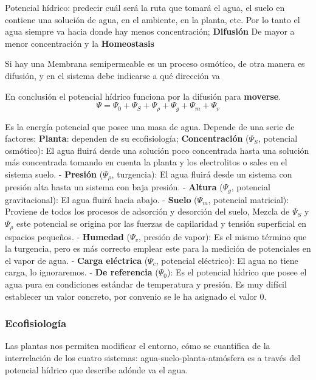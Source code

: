 Potencial hídrico: predecir cuál será la ruta que tomará el agua, el suelo en contiene una solución de agua, en el ambiente, en la planta, etc. Por lo tanto el agua siempre va hacia donde hay menos concentración; \textbf{Difusión} De mayor a menor concentración y la \textbf{Homeostasis}

Si hay una Membrana semipermeable es un proceso osmótico, de otra manera es difusión, y en el sistema debe indicarse a qué dirección va

En conclusión el potencial hídrico funciona por la difusión para \textbf{moverse}.
\begin{equation}
    \Psi= \Psi_0 + \Psi_S + \Psi_{\rho} + \Psi_g + \Psi_m + \Psi_v
\end{equation}
\begin{definition}
    Es la energía potencial que posee una masa de agua. Depende de una serie de factores: \textbf{Planta}: dependen de su ecofisiología; \textbf{Concentración} ($\Psi_S$, potencial osmótico): El agua fluirá desde una solución poco concentrada hasta una solución más concentrada tomando en cuenta la planta y los electrolitos o sales en el sistema suelo. - \textbf{Presión} ($\Psi_{\rho}$, turgencia): El agua fluirá desde un sistema con presión alta hasta un sistema con baja presión. - \textbf{Altura} ($\Psi_g$, potencial gravitacional): El agua fluirá hacia abajo. - \textbf{Suelo} ($\Psi_m$, potencial matricial): Proviene de todos los procesos de adsorción y desorción del suelo,  Mezcla de $\Psi_S$ y $\Psi_{\rho}$ este potencial se origina por las fuerzas de capilaridad y tensión superficial en espacios pequeños. - \textbf{Humedad} ($\Psi_v$, presión de vapor): Es el mismo término que la turgencia, pero es más correcto emplear este para la medición de potenciales en el vapor de agua. - \textbf{Carga eléctrica} ($\Psi_c$, potencial eléctrico): El agua no tiene carga, lo ignoraremos. - \textbf{De referencia} ($\Psi_0$): Es el potencial hídrico que posee el agua pura en condiciones estándar de temperatura y presión. Es muy difícil establecer un valor concreto, por convenio se le ha asignado el valor 0.
\end{definition}
\subsubsection{Ecofisiología}
Las plantas nos permiten modificar el entorno, cómo se cuantifica de la interrelación de los cuatro sistemas: agua-suelo-planta-atmósfera es a través del potencial hídrico que describe adónde va el agua.

